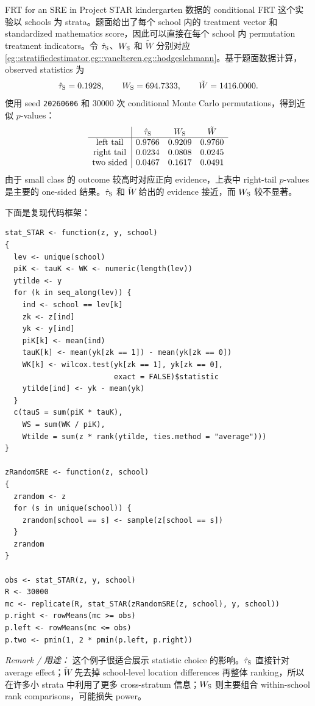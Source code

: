 \begin{exercisesolution}{FRT for an SRE in \citet{imbens2015causal}}{Project STAR kindergarten 数据的 conditional FRT}
这个实验以 schools 为 strata。题面给出了每个 school 内的 treatment vector 和 standardized mathematics score，因此可以直接在每个 school 内 permutation treatment indicators。令 $\hat\tau_{\textsc{S}}$、$W_{\textsc{S}}$ 和 $\tilde W$ 分别对应 \cref{eg::stratifiedestimator,eg::vanelteren,eg::hodgeslehmann}。基于题面数据计算，observed statistics 为
\[
\hat\tau_{\textsc{S}}=0.1928,\qquad
W_{\textsc{S}}=694.7333,\qquad
\tilde W=1416.0000.
\]
使用 seed \texttt{20260606} 和 $30000$ 次 conditional Monte Carlo permutations，得到近似 $p$-values：
\[
\begin{array}{c|ccc}
&\hat\tau_{\textsc{S}}&W_{\textsc{S}}&\tilde W\\ \hline
\text{left tail}&0.9766&0.9209&0.9760\\
\text{right tail}&0.0234&0.0808&0.0245\\
\text{two sided}&0.0467&0.1617&0.0491
\end{array}
\]
由于 small class 的 outcome 较高时对应正向 evidence，上表中 right-tail $p$-values 是主要的 one-sided 结果。$\hat\tau_{\textsc{S}}$ 和 $\tilde W$ 给出的 evidence 接近，而 $W_{\textsc{S}}$ 较不显著。

下面是复现代码框架：
\begin{lstlisting}
stat_STAR <- function(z, y, school)
{
  lev <- unique(school)
  piK <- tauK <- WK <- numeric(length(lev))
  ytilde <- y
  for (k in seq_along(lev)) {
    ind <- school == lev[k]
    zk <- z[ind]
    yk <- y[ind]
    piK[k] <- mean(ind)
    tauK[k] <- mean(yk[zk == 1]) - mean(yk[zk == 0])
    WK[k] <- wilcox.test(yk[zk == 1], yk[zk == 0],
                         exact = FALSE)$statistic
    ytilde[ind] <- yk - mean(yk)
  }
  c(tauS = sum(piK * tauK),
    WS = sum(WK / piK),
    Wtilde = sum(z * rank(ytilde, ties.method = "average")))
}

zRandomSRE <- function(z, school)
{
  zrandom <- z
  for (s in unique(school)) {
    zrandom[school == s] <- sample(z[school == s])
  }
  zrandom
}

obs <- stat_STAR(z, y, school)
R <- 30000
mc <- replicate(R, stat_STAR(zRandomSRE(z, school), y, school))
p.right <- rowMeans(mc >= obs)
p.left <- rowMeans(mc <= obs)
p.two <- pmin(1, 2 * pmin(p.left, p.right))
\end{lstlisting}

\emph{Remark / 用途：} 这个例子很适合展示 statistic choice 的影响。$\hat\tau_{\textsc{S}}$ 直接针对 average effect；$\tilde W$ 先去掉 school-level location differences 再整体 ranking，所以在许多小 strata 中利用了更多 cross-stratum 信息；$W_{\textsc{S}}$ 则主要组合 within-school rank comparisons，可能损失 power。
\end{exercisesolution}

